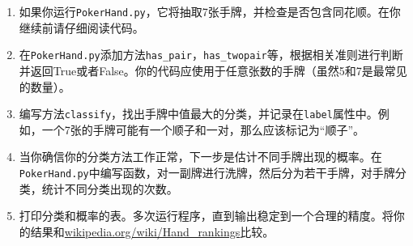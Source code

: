 \begin{ex}
\begin{enumerate}
\begin{description}
\end{description}
%
\item 如果你运行{\tt PokerHand.py}，它将抽取7张手牌，并检查是否包含同花顺。在你继续前请仔细阅读代码。

\item 在{\tt PokerHand.py}添加方法\verb"has_pair"，\verb"has_twopair"等，根据相关准则进行判断并返回True或者False。你的代码应使用于任意张数的手牌（虽然5和7是最常见的数量）。

\item 编写方法{\tt classify}，找出手牌中值最大的分类，并记录在{\tt label}属性中。例如，一个7张的手牌可能有一个顺子和一对，那么应该标记为“顺子”。

\item 当你确信你的分类方法工作正常，下一步是估计不同手牌出现的概率。在{\tt PokerHand.py}中编写函数，对一副牌进行洗牌，然后分为若干手牌，对手牌分类，统计不同分类出现的次数。

\item 打印分类和概率的表。多次运行程序，直到输出稳定到一个合理的精度。将你的结果和\url{wikipedia.org/wiki/Hand_rankings}比较。

\end{enumerate}
\end{ex}


